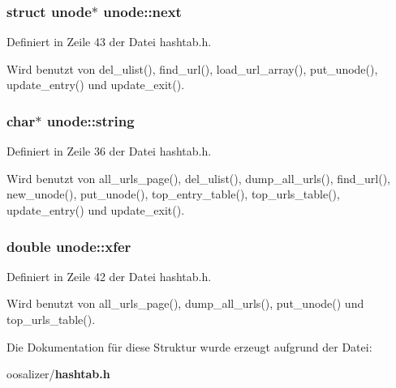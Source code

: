 \subsubsection{\setlength{\rightskip}{0pt plus 5cm}struct {\bf unode}$\ast$ {\bf unode::next}}\label{structunode_84a3ee805e5f7a6011c4c9c5866a27b6}




Definiert in Zeile 43 der Datei hashtab.h.

Wird benutzt von del\_\-ulist(), find\_\-url(), load\_\-url\_\-array(), put\_\-unode(), update\_\-entry() und update\_\-exit().
\subsubsection{\setlength{\rightskip}{0pt plus 5cm}char$\ast$ {\bf unode::string}}\label{structunode_7e4e6f981e97f717739e1844247456a0}




Definiert in Zeile 36 der Datei hashtab.h.

Wird benutzt von all\_\-urls\_\-page(), del\_\-ulist(), dump\_\-all\_\-urls(), find\_\-url(), new\_\-unode(), put\_\-unode(), top\_\-entry\_\-table(), top\_\-urls\_\-table(), update\_\-entry() und update\_\-exit().
\subsubsection{\setlength{\rightskip}{0pt plus 5cm}double {\bf unode::xfer}}\label{structunode_b0e69efc030906335d50a264aa2d2878}




Definiert in Zeile 42 der Datei hashtab.h.

Wird benutzt von all\_\-urls\_\-page(), dump\_\-all\_\-urls(), put\_\-unode() und top\_\-urls\_\-table().

Die Dokumentation f\"{u}r diese Struktur wurde erzeugt aufgrund der Datei:\begin{CompactItemize}
\item 
oosalizer/{\bf hashtab.h}\end{CompactItemize}
